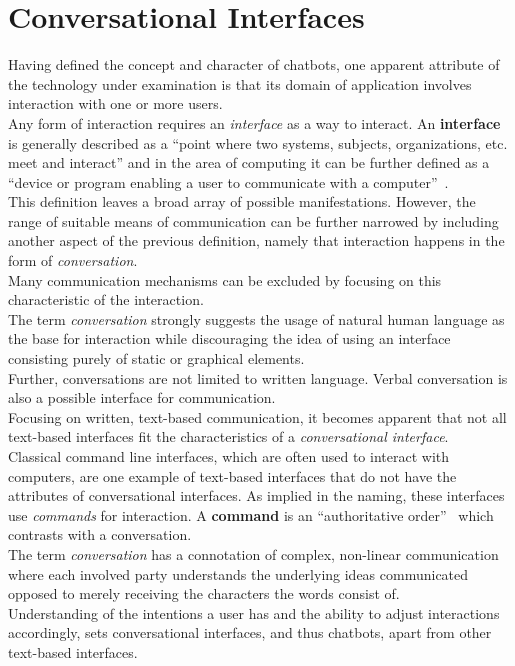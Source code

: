 \section{Conversational Interfaces}


Having defined the concept and character of chatbots, one apparent attribute of the technology under examination is that its domain of application involves interaction with one or more users.
\\

Any form of interaction requires an \emph{interface} as a way to interact.
An \textbf{interface} is generally described as a ``point where two systems, subjects, organizations, etc. meet and interact'' and in the area of computing it can be further defined as a ``device or program enabling a user to communicate with a computer''~\cite{oxfordinterface}.
\\

This definition leaves a broad array of possible manifestations.
However, the range of suitable means of communication can be further narrowed by including another aspect of the previous definition, namely that interaction happens in the form of \emph{conversation}.
\\

Many communication mechanisms can be excluded by focusing on this characteristic of the interaction.
\\
The term \emph{conversation} strongly suggests the usage of natural human language as the base for interaction
while discouraging the idea of using an interface consisting purely of static or graphical elements.
\\
Further, conversations are not limited to written language.
Verbal conversation is also a possible interface for communication.
\\

Focusing on written, text-based communication, it becomes apparent that not all text-based interfaces fit the characteristics of a \emph{conversational interface}.
\\
Classical command line interfaces, which are often used to interact with computers, are one example of text-based interfaces that do not have the attributes of conversational interfaces.
As implied in the naming, these interfaces use \emph{commands} for interaction. A \textbf{command} is an ``authoritative order''~\cite{oxfordcommand} which contrasts with a conversation.
\\
The term \emph{conversation} has a connotation of complex, non-linear communication where each involved party understands the underlying ideas communicated opposed to merely receiving the characters the words consist of.
\\

Understanding of the intentions a user has and the ability to adjust interactions accordingly, sets conversational interfaces, and thus chatbots, apart from other text-based interfaces.
